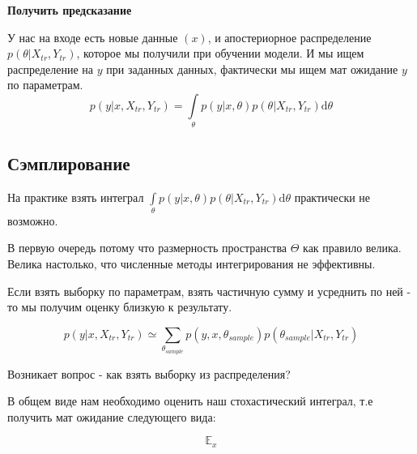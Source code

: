 \textbf{Получить предсказание}

У нас на входе есть новые данные $(x)$, и апостериорное распределение $p(\theta|X_{tr}, Y_{tr})$, которое мы получили при обучении модели. И мы ищем распределение на $y$ при заданных данных, фактически мы ищем мат ожидание $y$ по параметрам.
$$p(y|x, X_{tr}, Y_{tr}) = \int \limits_\theta p(y|x, \theta)p(\theta|X_{tr}, Y_{tr}) \mathrm d \theta$$

\subsection{Сэмплирование}

На практике взять интеграл $\int \limits_\theta p(y|x, \theta)p(\theta|X_{tr}, Y_{tr}) \mathrm d \theta$ практически не возможно. 

В первую очередь потому что размерность пространства $\Theta$ как правило велика. Велика настолько, что численные методы интегрирования не эффективны.

Если взять выборку по параметрам, взять частичную сумму и усреднить по ней - то мы получим оценку близкую к результату.

$$p(y|x, X_{tr}, Y_{tr}) \simeq \sum_{\theta_{sample}}p(y, x, \theta_{sample})p(\theta_{sample}| X_{tr}, Y_{tr})$$

Возникает вопрос - как взять выборку из распределения?

В общем виде нам необходимо оценить наш стохастический интеграл, т.е получить мат ожидание следующего вида:

$$\mathbb{E}_x$$
